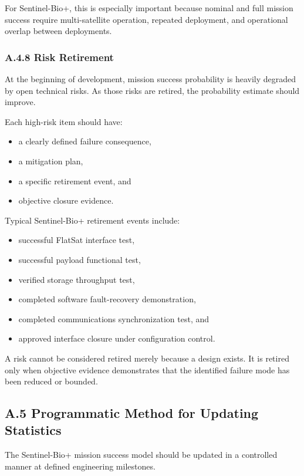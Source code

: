 \documentclass[11pt]{article}
\begin{document}
For Sentinel-Bio+, this is especially important because nominal and full mission success require
multi-satellite operation, repeated deployment, and operational overlap between deployments.

\subsubsection*{A.4.8 Risk Retirement}

At the beginning of development, mission success probability is heavily degraded by open technical
risks. As those risks are retired, the probability estimate should improve.

Each high-risk item should have:

\begin{itemize}
    \item a clearly defined failure consequence,
    \item a mitigation plan,
    \item a specific retirement event, and
    \item objective closure evidence.
\end{itemize}

Typical Sentinel-Bio+ retirement events include:

\begin{itemize}
    \item successful FlatSat interface test,
    \item successful payload functional test,
    \item verified storage throughput test,
    \item completed software fault-recovery demonstration,
    \item completed communications synchronization test, and
    \item approved interface closure under configuration control.
\end{itemize}

A risk cannot be considered retired merely because a design exists. It is retired only when objective
evidence demonstrates that the identified failure mode has been reduced or bounded.

\subsection*{A.5 Programmatic Method for Updating Statistics}

The Sentinel-Bio+ mission success model should be updated in a controlled manner at defined
engineering milestones.
\end{document}
